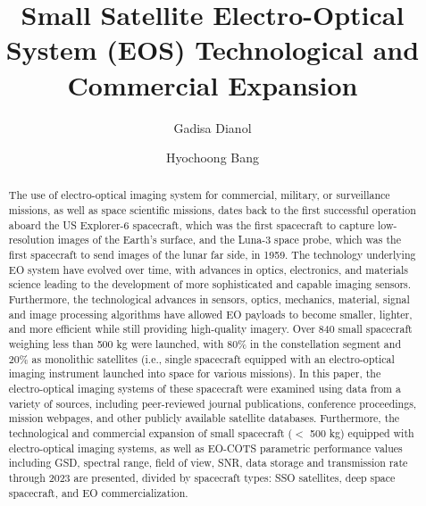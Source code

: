 \documentclass[final,5p,times,twocolumn,authoryear]{elsarticle}
\begin{document}
\begin{frontmatter}

\title{Small Satellite Electro-Optical System (EOS) Technological and Commercial Expansion}

\author[1]{Gadisa Dianol}
\author[1]{Hyochoong Bang}

\begin{abstract}
The use of electro-optical imaging system for commercial, military, or surveillance missions, as well as space scientific missions, dates back to the first successful operation aboard the US Explorer-6 spacecraft, which was the first spacecraft to capture low-resolution images of the Earth's surface, and the Luna-3 space probe, which was the first spacecraft to send images of the lunar far side, in 1959. The technology underlying EO system have evolved over time, with advances in optics, electronics, and materials science leading to the development of more sophisticated and capable imaging sensors. Furthermore, the technological advances in sensors, optics, mechanics, material, signal and image processing algorithms have allowed EO payloads to become smaller, lighter, and more efficient while still providing high-quality imagery.
Over 840 small spacecraft weighing less than 500 kg were launched, with 80\% in the constellation segment and 20\% as monolithic satellites (i.e., single spacecraft equipped with an electro-optical imaging instrument launched into space for various missions). In this paper, the electro-optical imaging systems of these spacecraft were examined using data from a variety of sources, including peer-reviewed journal publications, conference proceedings, mission webpages, and other publicly available satellite databases. 
Furthermore, the technological and commercial expansion of small spacecraft ($<$ 500 kg) equipped with electro-optical imaging systems, as well as EO-COTS parametric performance values including GSD, spectral range, field of view, SNR, data storage and transmission rate through 2023 are presented, divided by spacecraft types: SSO satellites, deep space spacecraft, and EO commercialization.
\end{abstract}


\end{frontmatter}
\end{document}
